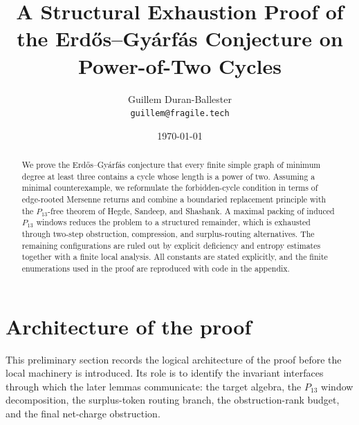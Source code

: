 \documentclass[11pt]{article}
\title{A Structural Exhaustion Proof of the Erd\H{o}s--Gy\'arf\'as Conjecture on Power-of-Two Cycles}
\author{Guillem Duran-Ballester\\\texttt{guillem@fragile.tech}}
\date{\today}
\begin{document}
\maketitle

\begin{abstract}
We prove the Erd\H{o}s--Gy\'arf\'as conjecture that every finite simple graph
of minimum degree at least three contains a cycle whose length is a power of
two.  Assuming a minimal counterexample, we reformulate the forbidden-cycle
condition in terms of edge-rooted Mersenne returns and combine a boundaried
replacement principle with the $P_{13}$-free theorem of Hegde, Sandeep, and
Shashank.  A maximal packing of induced $P_{13}$ windows reduces the problem
to a structured remainder, which is exhausted through two-step obstruction, compression,
and surplus-routing alternatives.  The remaining configurations are ruled out
by explicit deficiency and entropy estimates together with a finite local
analysis.  All constants are stated explicitly, and the finite enumerations
used in the proof are reproduced with code in the appendix.
\end{abstract}

\tableofcontents

\setcounter{section}{-1}
\section{Architecture of the proof}\label{sec:architecture}

This preliminary section records the logical architecture of the proof before
the local machinery is introduced.  Its role is to
identify the invariant interfaces through which the later lemmas communicate:
the target algebra, the $P_{13}$ window decomposition, the surplus-token
routing branch, the obstruction-rank budget, and the final net-charge
obstruction.
\end{document}
